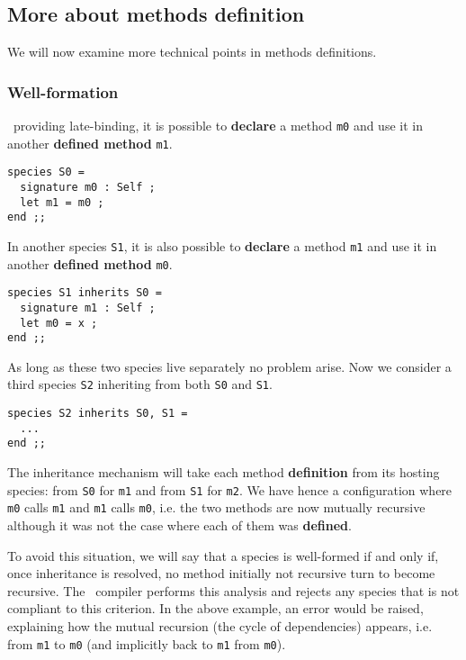 







\subsection{More about methods definition}
We will now examine more technical points in methods definitions.
\subsubsection{Well-formation}
\label{well-formation}

\focal\ providing late-binding, it is possible to {\bf declare} a
method {\tt m0} and use it in another {\bf defined method} {\tt m1}.

{\scriptsize
\begin{lstlisting}
species S0 =
  signature m0 : Self ;
  let m1 = m0 ;
end ;;
\end{lstlisting}
}

In another species {\tt S1}, it is also possible to {\bf declare} a
method {\tt m1} and use it in another {\bf defined method} {\tt m0}.
{\scriptsize
\begin{lstlisting}
species S1 inherits S0 =
  signature m1 : Self ;
  let m0 = x ;
end ;;
\end{lstlisting}
}

As long as these two species live separately no problem arise. Now we
consider a third species {\tt S2} inheriting from both {\tt S0} and
{\tt S1}.
{\scriptsize
\begin{lstlisting}
species S2 inherits S0, S1 =
  ...
end ;;
\end{lstlisting}
}

The inheritance mechanism will take each method {\bf definition} from
its hosting species: from {\tt S0} for {\tt m1} and from {\tt S1} for
{\tt m2}. We have hence a configuration where {\tt m0} calls {\tt m1}
and {\tt m1} calls {\tt m0}, i.e. the two methods are now mutually
recursive although it was not the case where each of them was
{\bf defined}.

To avoid this situation, we will say that a species is well-formed if
and only if, once inheritance is resolved, no method initially not
recursive turn to become recursive. The \focal\ compiler performs this
analysis and rejects any species that is not compliant to this
criterion. In the above example, an error would be raised, explaining
how the mutual recursion (the cycle of dependencies) appears,
i.e. from {\tt m1} to {\tt m0} (and implicitly back to {\tt m1} from
{\tt m0}).

